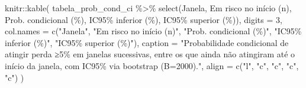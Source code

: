 \documentclass[
]{article}
\newenvironment{Shaded}{\begin{snugshade}}{\end{snugshade}}
\newcommand{\AttributeTok}[1]{\textcolor[rgb]{0.40,0.45,0.13}{#1}}
\newcommand{\DecValTok}[1]{\textcolor[rgb]{0.68,0.00,0.00}{#1}}
\newcommand{\FunctionTok}[1]{\textcolor[rgb]{0.28,0.35,0.67}{#1}}
\newcommand{\NormalTok}[1]{\textcolor[rgb]{0.00,0.23,0.31}{#1}}
\newcommand{\SpecialCharTok}[1]{\textcolor[rgb]{0.37,0.37,0.37}{#1}}
\newcommand{\StringTok}[1]{\textcolor[rgb]{0.13,0.47,0.30}{#1}}
\begin{document}
\begin{Shaded}
\begin{Highlighting}[]
\NormalTok{knitr}\SpecialCharTok{::}\FunctionTok{kable}\NormalTok{(}
\NormalTok{  tabela\_prob\_cond\_ci }\SpecialCharTok{\%\textgreater{}\%}
    \FunctionTok{select}\NormalTok{(Janela, }\StringTok{\textasciigrave{}}\AttributeTok{Em risco no início (n)}\StringTok{\textasciigrave{}}\NormalTok{, }\StringTok{\textasciigrave{}}\AttributeTok{Prob. condicional (\%)}\StringTok{\textasciigrave{}}\NormalTok{,}
           \StringTok{\textasciigrave{}}\AttributeTok{IC95\% inferior (\%)}\StringTok{\textasciigrave{}}\NormalTok{, }\StringTok{\textasciigrave{}}\AttributeTok{IC95\% superior (\%)}\StringTok{\textasciigrave{}}\NormalTok{),}
  \AttributeTok{digits =} \DecValTok{3}\NormalTok{,}
  \AttributeTok{col.names =} \FunctionTok{c}\NormalTok{(}\StringTok{"Janela"}\NormalTok{, }\StringTok{"Em risco no início (n)"}\NormalTok{, }\StringTok{"Prob. condicional (\%)"}\NormalTok{,}
                \StringTok{"IC95\% inferior (\%)"}\NormalTok{, }\StringTok{"IC95\% superior (\%)"}\NormalTok{),}
  \AttributeTok{caption =} \StringTok{"Probabilidade condicional de atingir perda ≥5\% em janelas sucessivas, entre os que ainda não atingiram até o início da janela, com IC95\% via bootstrap (B=2000)."}\NormalTok{,}
  \AttributeTok{align =} \FunctionTok{c}\NormalTok{(}\StringTok{"l"}\NormalTok{, }\StringTok{"c"}\NormalTok{, }\StringTok{"c"}\NormalTok{, }\StringTok{"c"}\NormalTok{, }\StringTok{"c"}\NormalTok{)}
\NormalTok{)}
\end{Highlighting}
\end{Shaded}
\end{document}
